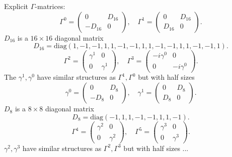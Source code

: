 
Explicit $\Gamma$-matrices:
\[
	\Gamma^0 = \begin{pmatrix}
		0 & D_{16} \\
		-D_{16} & 0
	\end{pmatrix},\quad
	\Gamma^1 = \begin{pmatrix}
		0 & D_{16} \\
		D_{16} & 0 
	\end{pmatrix}
.\] 
$D_{16}$ is a $16\times 16$ diagonal matrix
\[
	D_{16} = \mathrm{diag} (1,-1,-1,1,1,-1,-1,1,1,-1,-1,1,1,-1,-1,1)
.\] 
\[
	\Gamma^2 = \begin{pmatrix}
		\gamma^1 & 0 \\
		0 & \gamma^1
	\end{pmatrix},\quad
	\Gamma^3 = \begin{pmatrix}
		-i\gamma^0 & 0 \\
		0 & -i\gamma^0
	\end{pmatrix}
.\]
The $\gamma^1,\gamma^0$ have similar structures as $\Gamma^1,\Gamma^0$ but with half sizes
\[
	\gamma^0 = \begin{pmatrix}
		0 & D_8 \\
		-D_8 & 0 
	\end{pmatrix},\quad
	\gamma^1 = \begin{pmatrix}
		0 & D_8 \\
		D_8 & 0
	\end{pmatrix}
.\] 
$D_8$ is a $8\times 8$ diagonal matrix
\[
D_8 = \mathrm{diag} (-1,1,1,-1,-1,1,1,-1)
.\] 
\[
	\Gamma^4 = \begin{pmatrix}
		\gamma^2 & 0 \\
		0 & \gamma^2
	\end{pmatrix},\quad
	\Gamma^5 = \begin{pmatrix}
		\gamma^3 & 0 \\
		0 & \gamma^3
	\end{pmatrix}
.\] 
$\gamma^2,\gamma^3$ have similar structures as $\Gamma^2,\Gamma^3$ but with half sizes
 ...
